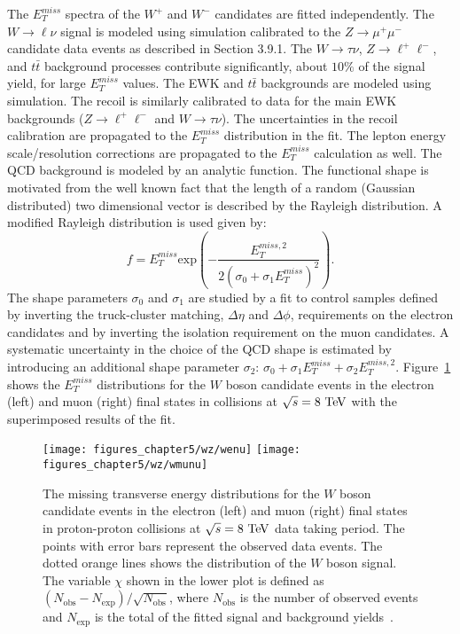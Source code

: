 The $E_{T}^{miss}$ spectra of the $W^{+}$ and $W^{-}$ candidates are fitted independently. The $W \rightarrow \ell \nu$ signal is modeled using simulation calibrated to the $Z \rightarrow \mu^{+}\mu^{-}$ candidate data events as described in Section 3.9.1. The $W \rightarrow \tau \nu$, $Z \rightarrow \ell^{+}\ell^{-}$, and $t\bar{t}$ background processes contribute significantly, about $10\%$ of the signal yield, for large $E_{T}^{miss}$ values. The EWK and $t\bar{t}$ backgrounds are modeled using simulation.  The recoil is similarly calibrated to data for the main EWK backgrounds ($Z \rightarrow \ell^{+}\ell^{-}$ and $W \rightarrow \tau \nu$). The uncertainties in the recoil calibration are propagated to the $E_{T}^{miss}$ distribution in the fit. The lepton energy scale/resolution corrections are propagated to the  $E_{T}^{miss}$ calculation as well. The QCD background is modeled by an analytic function. The functional shape is motivated from the well known fact that the length of a random (Gaussian distributed) two dimensional vector is described by the Rayleigh distribution. A modified Rayleigh distribution is used given by:
\begin{equation} \label{eq:rayleigh}
f = E_{T}^{miss} \mathrm{exp} \left(-\frac{E_{T}^{miss,2}}{2(\sigma_0+\sigma_1E_{T}^{miss})^2} \right).
\end{equation}  
The shape parameters $\sigma_0$ and $\sigma_1$ are studied by a fit to control samples defined by inverting the  truck-cluster matching,  $\Delta \eta$ and $\Delta \phi$, requirements on the electron candidates and by inverting the isolation requirement on the muon candidates. A systematic uncertainty in the choice of the QCD shape is estimated by introducing an additional shape parameter $\sigma_2$: $\sigma_0+\sigma_1E_{T}^{miss}+\sigma_2E_{T}^{miss,2}$. Figure~\ref{fig:W8} shows the $E_{T}^{miss}$ distributions for the  $W$ boson candidate events in the electron (left) and muon (right) final states in collisions at $\sqrt{s}=8~\mathrm{Te\kern -0.1em V}$ with the superimposed results of the fit.     
\begin{figure}[htbp]
\centering
\texttt{[image: figures\_chapter5/wz/wenu]}
\texttt{[image: figures\_chapter5/wz/wmunu]}
\caption{The missing transverse energy distributions for the $W$  boson candidate events in the electron (left) and muon (right) final states in proton-proton collisions at $\sqrt{s}=8~\mathrm{Te\kern -0.1em V}$ data taking period.  The points with error bars represent the observed data events. The dotted orange lines shows the distribution of the $W$ boson signal. The variable $\chi$ shown in the lower plot is defined as $(N_{\text{obs}}-N_{\text{exp}})/\sqrt{N_{\text{obs}}}$, where $N_{\text{obs}}$ is the number of observed events and $N_{\text{exp}}$ is the total of the fitted signal and background yields~\cite{Chatrchyan:2014mua}.
\label{fig:W8}}
\end{figure}
